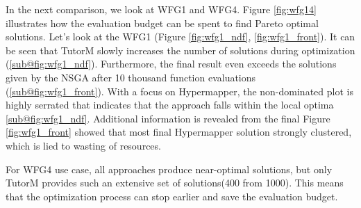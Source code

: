 
    In the next comparison, we look at WFG1 and WFG4. Figure \ref{fig:wfg14} illustrates how the evaluation budget can be spent to find Pareto optimal solutions. Let's look at the WFG1 (Figure \ref{fig:wfg1_ndf}, \ref{fig:wfg1_front}). It can be seen that TutorM slowly increases the number of solutions during optimization (\ref{sub@fig:wfg1_ndf}). Furthermore, the final result even exceeds the solutions given by the NSGA after 10 thousand function evaluations (\ref{sub@fig:wfg1_front}). With a focus on Hypermapper, the non-dominated plot is highly serrated that indicates that the approach falls within the local optima \ref{sub@fig:wfg1_ndf}. Additional information is revealed from the final Figure \ref{fig:wfg1_front} showed that most final Hypermapper solution strongly clustered, which is lied to wasting of resources.

    For WFG4 use case, all approaches produce near-optimal solutions, but only TutorM provides such an extensive set of solutions(400 from 1000). This means that the optimization process can stop earlier and save the evaluation budget.


